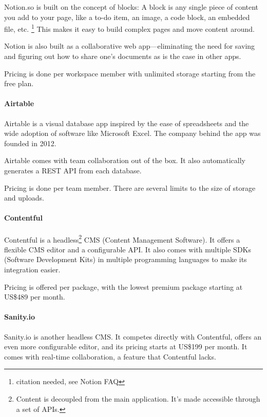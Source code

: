 \documentclass[
  12pt,
  a4paper,
]{article}
\begin{document}
Notion.so is built on the concept of blocks: A block is any single piece
of content you add to your page, like a to-do item, an image, a code
block, an embedded file, etc. \footnote{citation needed, see Notion FAQ}
This makes it easy to build complex pages and move content around.

Notion is also built as a collaborative web app---eliminating the need
for saving and figuring out how to share one's documents as is the case
in other apps.

Pricing is done per workspace member with unlimited storage starting
from the free plan.

\hypertarget{airtable}{%
\paragraph{Airtable}\label{airtable}}

Airtable is a visual database app inspired by the ease of spreadsheets
and the wide adoption of software like Microsoft Excel. The company
behind the app was founded in 2012.

Airtable comes with team collaboration out of the box. It also
automatically generates a REST API from each database.

Pricing is done per team member. There are several limits to the size of
storage and uploads.

\hypertarget{contentful}{%
\paragraph{Contentful}\label{contentful}}

Contentful is a headless\footnote{Content is decoupled from the main
  application. It's made accessible through a set of APIs.} CMS (Content
Management Software). It offers a flexible CMS editor and a configurable
API. It also comes with multiple SDKs (Software Development Kits) in
multiple programming languages to make its integration easier.

Pricing is offered per package, with the lowest premium package starting
at US\$489 per month.

\hypertarget{sanity.io}{%
\paragraph{Sanity.io}\label{sanity.io}}

Sanity.io is another headless CMS. It competes directly with Contentful,
offers an even more configurable editor, and its pricing starts at
US\$199 per month. It comes with real-time collaboration, a feature that
Contentful lacks.
\end{document}
